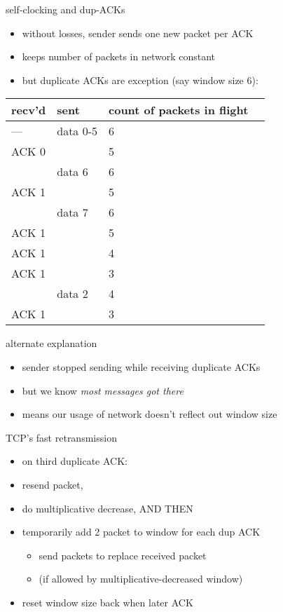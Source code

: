 \begin{frame}{self-clocking and dup-ACKs}
    \begin{itemize}
    \item without losses, sender sends one new packet per ACK
    \item keeps number of packets in network constant
    \item but duplicate ACKs are exception (say window size 6):
    \end{itemize}
{\fontsize{10}{11}\selectfont
\begin{tabular}{llll}
recv'd & sent & count of packets in flight \\ \hline
--- & data 0-5 & 6 \\
ACK 0 & ~ & 5 \\
~ & data 6 & 6 \\
ACK 1 & ~ & 5 \\
~ & data 7 & 6 \\
ACK 1 & ~  & 5 \\
ACK 1 & ~  & 4 \\
ACK 1 & ~ & 3 \\
~ & data 2 & 4 \\
ACK 1 & ~ & 3 \\
\end{tabular}
}
\end{frame}

\begin{frame}{alternate explanation}
    \begin{itemize}
    \item sender stopped sending while receiving duplicate ACKs
    \item but we know \textit{most messages got there}
    \item means our usage of network doesn't reflect out window size
    \end{itemize}
\end{frame}

\begin{frame}{TCP's fast retransmission}
\begin{itemize}
\item on third duplicate ACK:
\vspace{.5cm}
\item resend packet,
\item do multiplicative decrease, AND THEN
\item temporarily add 2 packet to window for each dup ACK
    \begin{itemize}
    \item send packets to replace received packet
    \item (if allowed by multiplicative-decreased window)
    \end{itemize}
\item reset window size back when later ACK
\end{itemize}
\end{frame}

